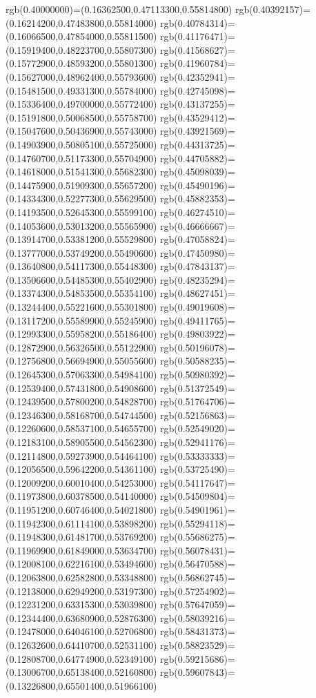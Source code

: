 {{rgb(0.40000000)=(0.16362500,0.47113300,0.55814800)
rgb(0.40392157)=(0.16214200,0.47483800,0.55814000)
rgb(0.40784314)=(0.16066500,0.47854000,0.55811500)
rgb(0.41176471)=(0.15919400,0.48223700,0.55807300)
rgb(0.41568627)=(0.15772900,0.48593200,0.55801300)
rgb(0.41960784)=(0.15627000,0.48962400,0.55793600)
rgb(0.42352941)=(0.15481500,0.49331300,0.55784000)
rgb(0.42745098)=(0.15336400,0.49700000,0.55772400)
rgb(0.43137255)=(0.15191800,0.50068500,0.55758700)
rgb(0.43529412)=(0.15047600,0.50436900,0.55743000)
rgb(0.43921569)=(0.14903900,0.50805100,0.55725000)
rgb(0.44313725)=(0.14760700,0.51173300,0.55704900)
rgb(0.44705882)=(0.14618000,0.51541300,0.55682300)
rgb(0.45098039)=(0.14475900,0.51909300,0.55657200)
rgb(0.45490196)=(0.14334300,0.52277300,0.55629500)
rgb(0.45882353)=(0.14193500,0.52645300,0.55599100)
rgb(0.46274510)=(0.14053600,0.53013200,0.55565900)
rgb(0.46666667)=(0.13914700,0.53381200,0.55529800)
rgb(0.47058824)=(0.13777000,0.53749200,0.55490600)
rgb(0.47450980)=(0.13640800,0.54117300,0.55448300)
rgb(0.47843137)=(0.13506600,0.54485300,0.55402900)
rgb(0.48235294)=(0.13374300,0.54853500,0.55354100)
rgb(0.48627451)=(0.13244400,0.55221600,0.55301800)
rgb(0.49019608)=(0.13117200,0.55589900,0.55245900)
rgb(0.49411765)=(0.12993300,0.55958200,0.55186400)
rgb(0.49803922)=(0.12872900,0.56326500,0.55122900)
rgb(0.50196078)=(0.12756800,0.56694900,0.55055600)
rgb(0.50588235)=(0.12645300,0.57063300,0.54984100)
rgb(0.50980392)=(0.12539400,0.57431800,0.54908600)
rgb(0.51372549)=(0.12439500,0.57800200,0.54828700)
rgb(0.51764706)=(0.12346300,0.58168700,0.54744500)
rgb(0.52156863)=(0.12260600,0.58537100,0.54655700)
rgb(0.52549020)=(0.12183100,0.58905500,0.54562300)
rgb(0.52941176)=(0.12114800,0.59273900,0.54464100)
rgb(0.53333333)=(0.12056500,0.59642200,0.54361100)
rgb(0.53725490)=(0.12009200,0.60010400,0.54253000)
rgb(0.54117647)=(0.11973800,0.60378500,0.54140000)
rgb(0.54509804)=(0.11951200,0.60746400,0.54021800)
rgb(0.54901961)=(0.11942300,0.61114100,0.53898200)
rgb(0.55294118)=(0.11948300,0.61481700,0.53769200)
rgb(0.55686275)=(0.11969900,0.61849000,0.53634700)
rgb(0.56078431)=(0.12008100,0.62216100,0.53494600)
rgb(0.56470588)=(0.12063800,0.62582800,0.53348800)
rgb(0.56862745)=(0.12138000,0.62949200,0.53197300)
rgb(0.57254902)=(0.12231200,0.63315300,0.53039800)
rgb(0.57647059)=(0.12344400,0.63680900,0.52876300)
rgb(0.58039216)=(0.12478000,0.64046100,0.52706800)
rgb(0.58431373)=(0.12632600,0.64410700,0.52531100)
rgb(0.58823529)=(0.12808700,0.64774900,0.52349100)
rgb(0.59215686)=(0.13006700,0.65138400,0.52160800)
rgb(0.59607843)=(0.13226800,0.65501400,0.51966100)
}}
